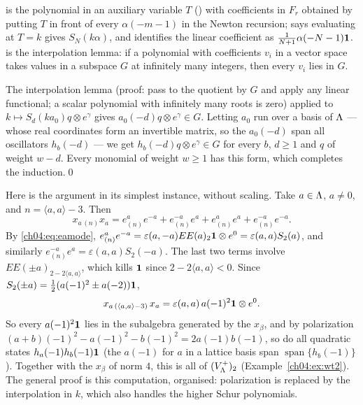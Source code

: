 \begin{dictionary}
 is the polynomial in an auxiliary variable $T$ () with
coefficients in $F_r$ obtained by putting $T$ in front of every $\alpha(-m-1)$ in the Newton
recursion;  says evaluating at $T=k$ gives $S_N(k\alpha)$, and
 identifies the linear coefficient as $\tfrac1{N+1}\alpha(-N-1)\mathbf{1}$.
 is the interpolation lemma: if a polynomial with coefficients
$v_i$ in a vector space takes values in a subspace $G$ at infinitely many integers, then every
$v_i$ lies in $G$.
\end{dictionary}

The interpolation lemma (proof: pass to the quotient by $G$ and apply any linear functional; a
scalar polynomial with infinitely many roots is zero) applied to $k\mapsto S_d(ka_0)q\otimes e^\gamma$
gives $a_0(-d)q\otimes e^\gamma\in G$. Letting $a_0$ run over a basis of ${\Lambda}$ --- whose real
coordinates form an invertible matrix, so the $a_0(-d)$ span all oscillators $h_b(-d)$ --- we get
$h_b(-d)q\otimes e^\gamma\in G$ for every $b$, $d\ge1$ and $q$ of weight $w-d$. Every monomial of
weight $w\ge1$ has this form, which completes the induction.\qed

\begin{example}\label{ch04:ex:genwt2}
Here is the argument in its simplest instance, without scaling. Take $a\in{\Lambda}$, $a\neq0$, and
$n=\langle a,a\rangle-3$. Then
\begin{equation*}
  x_{a\,(n)}x_a=e^a_{(n)}e^{-a}+e^{-a}_{(n)}e^{a}+e^a_{(n)}e^a+e^{-a}_{(n)}e^{-a}.
\end{equation*}
By \eqref{ch04:eq:eamode}, $e^a_{(n)}e^{-a}=\varepsilon(a,-a)EE(a)_{2}\mathbf{1}\otimes e^0=\varepsilon(a,a)S_2(a)$,
and similarly $e^{-a}_{(n)}e^a=\varepsilon(a,a)S_2(-a)$. The last two terms involve $EE(\pm a)_{2-2\langle a,a\rangle}$,
which kills $\mathbf{1}$ since $2-2\langle a,a\rangle<0$. Since $S_2(\pm a)=\tfrac12(a(-1)^2\pm a(-2))\mathbf{1}$,
\begin{equation*}
  x_{a\,(\langle a,a\rangle-3)}\,x_a=\varepsilon(a,a)\,a(-1)^2\mathbf{1}\otimes e^0 .
\end{equation*}
So every $a(-1)^2\mathbf{1}$ lies in the subalgebra generated by the $x_\beta$, and by polarization
$(a+b)(-1)^2-a(-1)^2-b(-1)^2=2a(-1)b(-1)$, so do all quadratic states $h_a(-1)h_b(-1)\mathbf{1}$
(the $a(-1)$ for $a$ in a lattice basis span $\operatorname{span}\{h_b(-1)\}$). Together with the
$x_\beta$ of norm $4$, this is all of $(V_{\Lambda}^+)_2$ (Example~\ref{ch04:ex:wt2}). The general proof
is this computation, organised: polarization is replaced by the interpolation in $k$, which also
handles the higher Schur polynomials.
\end{example}

